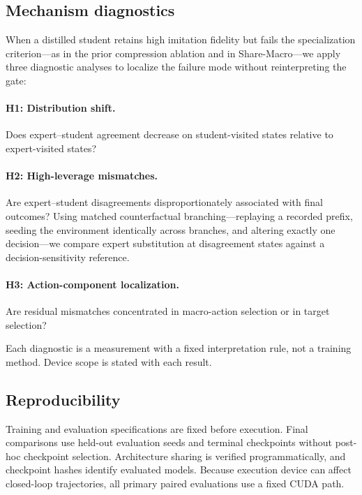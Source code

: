 \documentclass{article}
\begin{document}
\subsection{Mechanism diagnostics}
\label{sec:diagnostics}

When a distilled student retains high imitation fidelity but fails the
specialization criterion---as in the prior compression ablation and in
Share-Macro---we apply three diagnostic analyses to localize the failure mode
without reinterpreting the gate:

\paragraph{H1: Distribution shift.}
Does expert--student agreement decrease on student-visited states relative to
expert-visited states?

\paragraph{H2: High-leverage mismatches.}
Are expert--student disagreements disproportionately associated with final
outcomes? Using matched counterfactual branching---replaying a recorded prefix,
seeding the environment identically across branches, and altering exactly one
decision---we compare expert substitution at disagreement states against a
decision-sensitivity reference.

\paragraph{H3: Action-component localization.}
Are residual mismatches concentrated in macro-action selection or in target
selection?

Each diagnostic is a measurement with a fixed interpretation rule, not a
training method. Device scope is stated with each result.

\subsection{Reproducibility}
\label{sec:repro}

Training and evaluation specifications are fixed before execution. Final
comparisons use held-out evaluation seeds and terminal checkpoints without
post-hoc checkpoint selection. Architecture sharing is verified
programmatically, and checkpoint hashes identify evaluated models. Because
execution device can affect closed-loop trajectories, all primary paired
evaluations use a fixed CUDA path.
\end{document}
